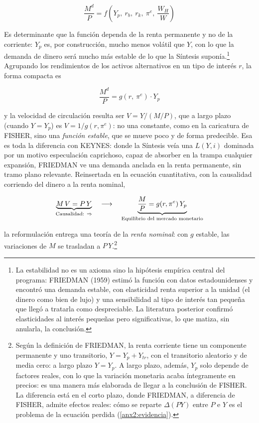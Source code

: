 \documentclass[10pt,a4paper]{article}
\begin{document}
$$\frac{M^{d}}{P}=f\!\left(Y_p,\ r_b,\ r_k,\ \pi^{e},\ \frac{W_H}{W}\right)$$

Es determinante que la función dependa de la renta permanente y no de la corriente: $Y_p$ es, por construcción, mucho menos volátil que $Y$, con lo que la demanda de dinero será mucho más estable de lo que la Síntesis suponía.\footnote{%
    La estabilidad no es un axioma sino la hipótesis empírica central del programa: FRIEDMAN (1959) estimó la función con datos estadounidenses y encontró una demanda estable, con elasticidad renta superior a la unidad (el dinero como bien de lujo) y una sensibilidad al tipo de interés tan pequeña que llegó a tratarla como despreciable. La literatura posterior confirmó elasticidades al interés pequeñas pero significativas, lo que matiza, sin anularla, la conclusión.
} Agrupando los rendimientos de los activos alternativos en un tipo de interés $r$, la forma compacta es

$$\frac{M^{d}}{P}=g(r,\ \pi^{e})\cdot Y_p$$

y la velocidad de circulación resulta ser $V=Y/(M/P)$, que a largo plazo (cuando $Y=Y_p$) es $V=1/g(r,\pi^{e})$: no una constante, como en la caricatura de FISHER, sino una \textit{función estable}, que se mueve poco y de forma predecible. Esa es toda la diferencia con KEYNES: donde la Síntesis veía una $L(Y,i)$ dominada por un motivo especulación caprichoso, capaz de absorber en la trampa cualquier expansión, FRIEDMAN ve una demanda anclada en la renta permanente, sin tramo plano relevante. Reinsertada en la ecuación cuantitativa, con la causalidad corriendo del dinero a la renta nominal,

$$\underbrace{M\,V=P\,Y}_{\text{\scriptsize Causalidad: }\Rightarrow}\quad\longrightarrow\quad \underbrace{\frac{M}{P}=g(r,\pi^{e})\,Y_p}_{\text{\scriptsize Equilibrio del mercado monetario}}$$

la reformulación entrega una teoría de la \textit{renta nominal}: con $g$ estable, las variaciones de $M$ se trasladan a $P\,Y$.\footnote{%
    Según la definición de FRIEDMAN, la renta corriente tiene un componente permanente y uno transitorio, $Y=Y_p+Y_{tr}$, con el transitorio aleatorio y de media cero: a largo plazo $Y=Y_p$. A largo plazo, además, $Y_p$ solo depende de factores reales, con lo que la variación monetaria acaba íntegramente en precios: es una manera más elaborada de llegar a la conclusión de FISHER. La diferencia está en el corto plazo, donde FRIEDMAN, a diferencia de FISHER, admite efectos reales: cómo se reparte $\Delta(PY)$ entre $P$ e $Y$ es el problema de la ecuación perdida (\ref{anx2:evidencia}).
}
\end{document}
